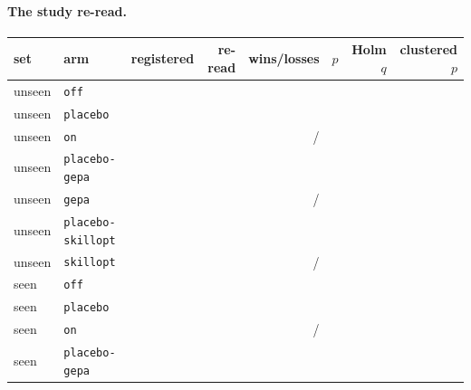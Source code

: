 \paragraph{The study re-read.}

\begin{center}
\begin{tabular}{llrrrrrr}
\toprule
set & arm & registered & re-read & wins/losses & $p$ & Holm $q$ & clustered $p$ \\
\midrule
unseen & \texttt{off} & \NUM{\accUnseenOff} & \NUM{\rescoredAccUnseenOff} & & & & \\
unseen & \texttt{placebo} & \NUM{\accUnseenPlacebo} & \NUM{\rescoredAccUnseenPlacebo} & & & & \\
unseen & \texttt{on} & \NUM{\accUnseenOn} & \NUM{\rescoredAccUnseenOn} & \NUM{\rescoredWinsUnseenOn}/\NUM{\rescoredLossesUnseenOn} & \NUM{\rescoredPUnseenOn} & \NUM{\rescoredQUnseenOn} & \NUM{\rescoredClusteredUnseenOn} \\
unseen & \texttt{placebo-gepa} & \NUM{\accUnseenPlaceboGepa} & \NUM{\rescoredAccUnseenPlaceboGepa} & & & & \\
unseen & \texttt{gepa} & \NUM{\accUnseenGepa} & \NUM{\rescoredAccUnseenGepa} & \NUM{\rescoredWinsUnseenGepaVsPlaceboGepa}/\NUM{\rescoredLossesUnseenGepaVsPlaceboGepa} & \NUM{\rescoredPUnseenGepaVsPlaceboGepa} & \NUM{\rescoredQUnseenGepaVsPlaceboGepa} & \NUM{\rescoredClusteredUnseenGepaVsPlaceboGepa} \\
unseen & \texttt{placebo-skillopt} & \NUM{\accUnseenPlaceboSkillopt} & \NUM{\rescoredAccUnseenPlaceboSkillopt} & & & & \\
unseen & \texttt{skillopt} & \NUM{\accUnseenSkillopt} & \NUM{\rescoredAccUnseenSkillopt} & \NUM{\rescoredWinsUnseenSkilloptVsPlaceboSkillopt}/\NUM{\rescoredLossesUnseenSkilloptVsPlaceboSkillopt} & \NUM{\rescoredPUnseenSkilloptVsPlaceboSkillopt} & \NUM{\rescoredQUnseenSkilloptVsPlaceboSkillopt} & \NUM{\rescoredClusteredUnseenSkilloptVsPlaceboSkillopt} \\
\midrule
seen & \texttt{off} & \NUM{\accSeenOff} & \NUM{\rescoredAccSeenOff} & & & & \\
seen & \texttt{placebo} & \NUM{\accSeenPlacebo} & \NUM{\rescoredAccSeenPlacebo} & & & & \\
seen & \texttt{on} & \NUM{\accSeenOn} & \NUM{\rescoredAccSeenOn} & \NUM{\rescoredWinsSeenOn}/\NUM{\rescoredLossesSeenOn} & \NUM{\rescoredPSeenOn} & \NUM{\rescoredQSeenOn} & \NUM{\rescoredClusteredSeenOn} \\
seen & \texttt{placebo-gepa} & \NUM{\accSeenPlaceboGepa} & \NUM{\rescoredAccSeenPlaceboGepa} & & & & \\

\end{tabular}
\end{center}

